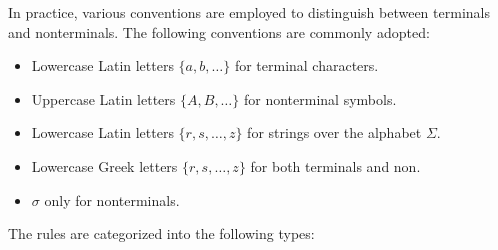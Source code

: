 In practice, various conventions are employed to distinguish between terminals and nonterminals. 
The following conventions are commonly adopted:
\begin{itemize}
    \item Lowercase Latin letters $\{a,b,\dots\}$ for terminal characters. 
    \item Uppercase Latin letters $\{A,B,\dots\}$ for nonterminal symbols. 
    \item Lowercase Latin letters $\{r,s,\dots,z\}$ for strings over the alphabet $\Sigma$. 
    \item Lowercase Greek letters $\{r,s,\dots,z\}$ for both terminals and non. 
    \item $\sigma$ only for nonterminals. 
\end{itemize}
The rules are categorized into the following types:
